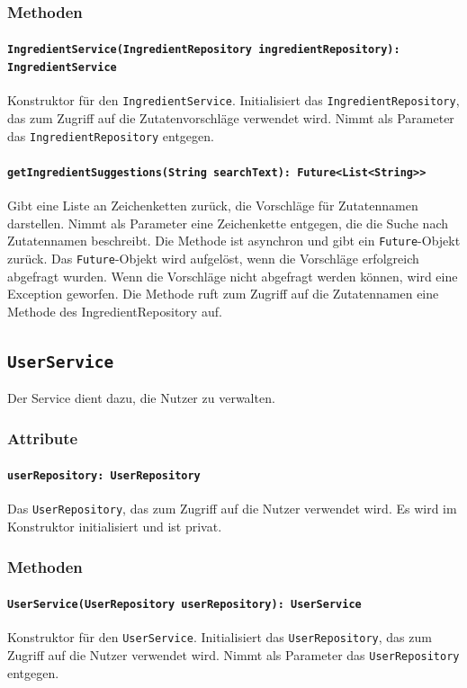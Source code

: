 \documentclass[parskip=full]{scrartcl}
\begin{document}
\subsubsection*{Methoden}
\paragraph{\texttt{IngredientService(IngredientRepository ingredientRepository): IngredientService}}
Konstruktor für den \texttt{IngredientService}. Initialisiert das \texttt{IngredientRepository}, das zum Zugriff auf die Zutatenvorschläge verwendet wird. Nimmt als Parameter das \texttt{IngredientRepository} entgegen.
\paragraph{\texttt{getIngredientSuggestions(String searchText): Future<List<String>>}}
Gibt eine Liste an Zeichenketten zurück, die Vorschläge für Zutatennamen darstellen. Nimmt als Parameter eine Zeichenkette entgegen, die die Suche nach Zutatennamen beschreibt. Die Methode ist asynchron und gibt ein \texttt{Future}-Objekt zurück. Das \texttt{Future}-Objekt wird aufgelöst, wenn die Vorschläge erfolgreich abgefragt wurden. Wenn die Vorschläge nicht abgefragt werden können, wird eine Exception geworfen. Die Methode ruft zum Zugriff auf die Zutatennamen eine Methode des IngredientRepository auf.

\newpage
\subsection{\texttt{UserService}}
Der Service dient dazu, die Nutzer zu verwalten.
\subsubsection*{Attribute}
\paragraph{\texttt{userRepository: UserRepository}}
Das \texttt{UserRepository}, das zum Zugriff auf die Nutzer verwendet wird. Es wird im Konstruktor initialisiert und ist privat.
\subsubsection*{Methoden}
\paragraph{\texttt{UserService(UserRepository userRepository): UserService}}
Konstruktor für den \texttt{UserService}. Initialisiert das \texttt{UserRepository}, das zum Zugriff auf die Nutzer verwendet wird. Nimmt als Parameter das \texttt{UserRepository} entgegen.
\end{document}
